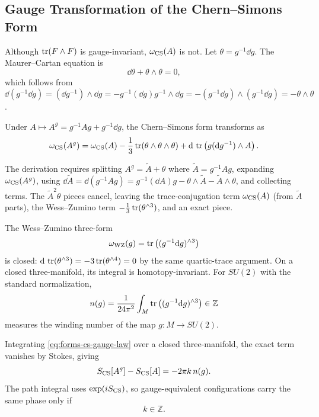 \subsection{Gauge Transformation of the Chern--Simons Form}
\label{subsec:cs-gauge-transformation}

Although $\operatorname{tr}(F\wedge F)$ is gauge-invariant, $\omega_{\operatorname{CS}}(A)$ is not. Let $\theta=g^{-1}\dd g$. The Maurer--Cartan equation is
\begin{equation}
  \dd\theta+\theta\wedge\theta=0,
  \label{eq:forms-maurer-cartan}
\end{equation}
which follows from $\dd(g^{-1}\dd g)=(\dd g^{-1})\wedge\dd g=-g^{-1}(\dd g)g^{-1}\wedge\dd g=-(g^{-1}\dd g)\wedge(g^{-1}\dd g)=-\theta\wedge\theta$.

Under $A\mapsto A^g=g^{-1}Ag+g^{-1}\dd g$, the Chern--Simons form transforms as
\begin{equation}
  \omega_{\operatorname{CS}}(A^g)
  =
  \omega_{\operatorname{CS}}(A)
  -
  \frac13\operatorname{tr}(\theta\wedge\theta\wedge\theta)
  +
  \mathrm{d}\,\operatorname{tr}\left(g(\mathrm{d} g^{-1})\wedge A\right).
  \label{eq:forms-cs-gauge-law}
\end{equation}

The derivation requires splitting $A^g=\widetilde A+\theta$ where $\widetilde A=g^{-1}Ag$, expanding $\omega_{\operatorname{CS}}(A^g)$, using $\dd\widetilde A=\dd(g^{-1}Ag)=g^{-1}(\dd A)g-\theta\wedge\widetilde A-\widetilde A\wedge\theta$, and collecting terms. The $\widetilde A^2\theta$ pieces cancel, leaving the trace-conjugation term $\omega_{\operatorname{CS}}(A)$ (from $\widetilde A$ parts), the Wess--Zumino term $-\frac13\operatorname{tr}(\theta^{\wedge 3})$, and an exact piece.

The Wess--Zumino three-form
\begin{equation}
  \omega_{\mathrm{WZ}}(g)
  =
  \operatorname{tr}\left((g^{-1}\mathrm{d} g)^{\wedge 3}\right)
  \label{eq:forms-wz-form}
\end{equation}
is closed: $\mathrm{d}\,\operatorname{tr}(\theta^{\wedge 3})=-3\operatorname{tr}(\theta^{\wedge 4})=0$ by the same quartic-trace argument. On a closed three-manifold, its integral is homotopy-invariant. For $SU(2)$ with the standard normalization,
\begin{equation}
  n(g)
  =
  \frac{1}{24\pi^2}
  \int_M \operatorname{tr}\left((g^{-1}\mathrm{d} g)^{\wedge 3}\right)
  \in\mathbb Z
  \label{eq:forms-winding-number}
\end{equation}
measures the winding number of the map $g:M\to SU(2)$.

Integrating \eqref{eq:forms-cs-gauge-law} over a closed three-manifold, the exact term vanishes by Stokes, giving
\begin{equation}
  S_{\operatorname{CS}}[A^g]-S_{\operatorname{CS}}[A]
  =
  -2\pi k\,n(g).
  \label{eq:forms-action-shift}
\end{equation}
The path integral uses $\exp(iS_{\operatorname{CS}})$, so gauge-equivalent configurations carry the same phase only if
\begin{equation}
  k\in\mathbb Z.
  \label{eq:forms-level-integer}
\end{equation}

